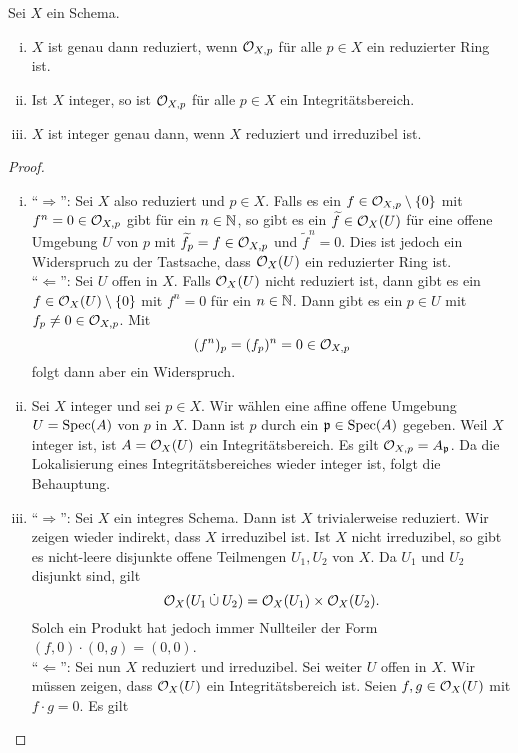 \begin{prop}\label{prop:6.5}
	Sei $X$ ein Schema.
	\begin{enumerate}[i)]
		\item $X$ ist genau dann reduziert, wenn $\mathcal{O}_{X,p}$ für alle $p \in X$ ein reduzierter Ring ist.
		\item Ist $X$ integer, so ist $\mathcal{O}_{X,p}$ für alle $p \in X$ ein Integritätsbereich.
		\item $X$ ist integer genau dann, wenn $X$ reduziert und irreduzibel ist.
	\end{enumerate}
	\begin{proof}
		\begin{enumerate}[i)]
			\item
			\enquote{$\Longrightarrow$}: Sei $X$ also reduziert und $p \in X$. Falls es ein $f \in \mathcal{O}_{X,p}\setminus\{0\}$ mit $f^n=0 \in \mathcal{O}_{X,p}$ gibt für ein $n \in \mathbb {N}$, so gibt es ein $\widetilde{f}\in \mathcal{O}_{X}(U)$ für eine offene Umgebung $U$ von $p$ mit $\widetilde{f}_p=f \in \mathcal{O}_{X,p}$ und $\widetilde{f}^n = 0$. Dies ist jedoch ein Widerspruch zu der Tastsache, dass $\mathcal{O}_{X}(U)$ ein reduzierter Ring ist.\\
			\enquote{$\Longleftarrow$}: Sei $U$ offen in $X$. Falls $\mathcal{O}_X(U)$ nicht reduziert ist, dann gibt es ein $f \in \mathcal{O}_X(U)\setminus\{0\}$ mit $f^n = 0$ für ein $n \in \mathbb {N}$. Dann gibt es ein $p \in U$ mit $f_p \neq 0 \in \mathcal{O}_{X,p}$. Mit
			\[
				(f^n)_p = (f_p)^n=0 \in \mathcal{O}_{X,p}
			\]
			folgt dann aber ein Widerspruch.
			\item Sei $X$ integer und sei $p \in X$. Wir wählen eine affine offene Umgebung $U = \operatorname{Spec}(A)$ von $p$ in $X$. Dann ist $p$ durch ein $\mathfrak{p} \in \operatorname{Spec}(A)$ gegeben. Weil $X$ integer ist, ist $A = \mathcal{O}_X(U)$ ein Integritätsbereich. Es gilt $\mathcal{O}_{X,p} = A_{\mathfrak{p}}$. Da die Lokalisierung eines Integritätsbereiches wieder integer ist, folgt die Behauptung.
			\item \enquote{$\Longrightarrow$}: Sei $X$ ein integres Schema. Dann ist $X$ trivialerweise reduziert. Wir zeigen wieder indirekt, dass $X$ irreduzibel ist. Ist $X$ nicht irreduzibel, so gibt es nicht-leere disjunkte offene Teilmengen $U_1,U_2$ von $X$. Da $U_1$ und $U_2$ disjunkt sind, gilt
			\[
				\mathcal{O}_X(U_1 \mathbin{\dot{\cup}} U_2) = \mathcal{O}_{X}(U_1) \times \mathcal{O}_{X}(U_2).
			\]
			Solch ein Produkt hat jedoch immer Nullteiler der Form $(f,0) \cdot (0,g) = (0,0)$.\\
			\enquote{$\Longleftarrow$}: Sei nun $X$ reduziert und irreduzibel. Sei weiter $U$ offen in $X$. Wir müssen zeigen, dass $\mathcal{O}_X(U)$ ein Integritätsbereich ist. Seien $f,g \in \mathcal{O}_X(U)$ mit $f\cdot g = 0$. Es gilt

\end{enumerate}
\end{proof}
\end{prop}
